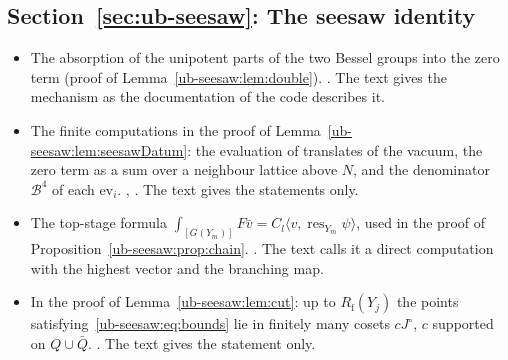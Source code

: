 \subsection*{Section~\ref{sec:ub-seesaw}: The seesaw identity}
\begin{itemize}[leftmargin=2em,itemsep=1pt]
\item The absorption of the unipotent parts of the two Bessel groups into the zero term (proof of
  Lemma~\ref{ub-seesaw:lem:double}).
  . The text gives the
  mechanism as the documentation of the code describes it.
\item The finite computations in the proof of Lemma~\ref{ub-seesaw:lem:seesawDatum}: the evaluation of
  translates of the vacuum, the zero term as a sum over a neighbour lattice above $N$, and the
  denominator $\mathcal B^4$ of each $\mathrm{ev}_i$. ,
  . The text gives the statements only.
\item The top-stage formula $\int_{[G(Y_m)]}F\bar v=C_l\langle v,\operatorname{res}_{Y_m}\psi\rangle$, used in
  the proof of Proposition~\ref{ub-seesaw:prop:chain}.
  . The text calls it a direct computation
  with the highest vector and the branching map.
\item In the proof of Lemma~\ref{ub-seesaw:lem:cut}: up to $R_{\mathrm f}(Y_j)$ the points
  satisfying~\eqref{ub-seesaw:eq:bounds} lie in finitely many cosets $cJ^\circ$, $c$ supported on
  $Q\cup\bar Q$. . The text gives the statement only.
\end{itemize}


